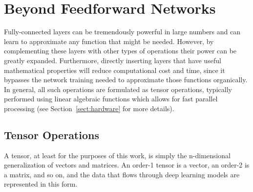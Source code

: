 \section{Beyond Feedforward Networks} \label{sect:nn_advanced_start}
Fully-connected layers can be tremendously powerful in large numbers and can learn to approximate any
function that might be needed. However, by complementing these layers with other types of operations their
power can be greatly expanded. Furthermore, directly inserting layers that have useful mathematical properties will reduce
computational cost and time, since it bypasses the network training needed to approximate those functions organically.
In general, all such operations are formulated as tensor operations, typically performed using linear algebraic functions
which allows for fast parallel processing (see Section~\ref{sect:hardware} for more details).

\subsection{Tensor Operations}
A tensor, at least for the purposes of this work, is simply the n-dimensional generalization of vectors and matrices.
An order-1 tensor is a vector, an order-2 is a matrix, and so on, and the data that flows through deep learning models are represented in this form.

